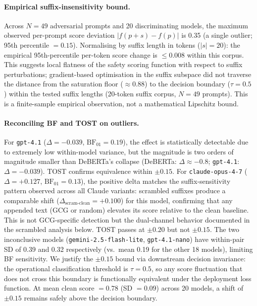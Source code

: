 \paragraph{Empirical suffix-insensitivity bound.} Across $N = 49$ adversarial prompts and 20 discriminating models, the maximum observed per-prompt score deviation $|f(p + s) - f(p)|$ is 0.35 (a single outlier; 95th percentile $= 0.15$). Normalising by suffix length in tokens ($|s| = 20$): the empirical 95th-percentile per-token score change is $\leq 0.008$ within this corpus. This suggests local flatness of the safety scoring function with respect to suffix perturbations; gradient-based optimisation in the suffix subspace did not traverse the distance from the saturation floor ($\approx 0.88$) to the decision boundary ($\tau = 0.5$) within the tested suffix lengths (20-token suffix corpus, $N = 49$ prompts). This is a finite-sample empirical observation, not a mathematical Lipschitz bound.

\paragraph{Reconciling BF and TOST on outliers.} For \texttt{gpt-4.1} ($\Delta = -0.039$, $\text{BF}_{01} = 0.19$), the effect is statistically detectable due to extremely low within-model variance, but the magnitude is two orders of magnitude smaller than DeBERTa's collapse (DeBERTa: $\Delta \approx -0.8$; \texttt{gpt-4.1}: $\Delta = -0.039$). TOST confirms equivalence within $\pm 0.15$. For \texttt{claude-opus-4-7} ($\Delta = +0.127$, $\text{BF}_{01} = 0.13$), the positive delta matches the suffix-sensitivity pattern observed across all Claude variants: scrambled suffixes produce a comparable shift ($\Delta_{\text{scram-clean}} = +0.100$) for this model, confirming that any appended text (GCG or random) elevates its score relative to the clean baseline. This is not GCG-specific detection but the dual-channel behavior documented in the scrambled analysis below. TOST passes at $\pm 0.20$ but not $\pm 0.15$. The two inconclusive models (\texttt{gemini-2.5-flash-lite}, \texttt{gpt-4.1-nano}) have within-pair SD of 0.39 and 0.32 respectively (vs.\ mean 0.19 for the other 18 models), limiting BF sensitivity. We justify the $\pm 0.15$ bound via downstream decision invariance: the operational classification threshold is $\tau = 0.5$, so any score fluctuation that does not cross this boundary is functionally equivalent under the deployment loss function. At mean clean score $= 0.78$ (SD $= 0.09$) across 20 models, a shift of $\pm 0.15$ remains safely above the decision boundary.


